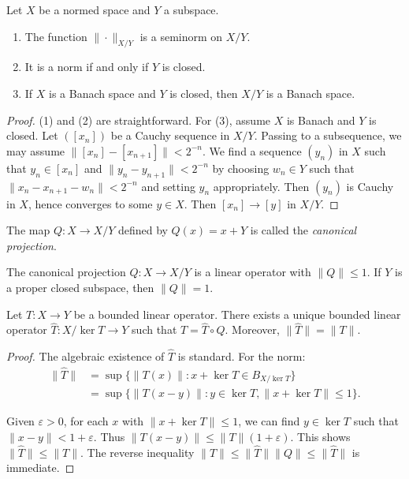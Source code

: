 \begin{proposition}
\label{proposition-quotient-norm-properties}
Let $X$ be a normed space and $Y$ a subspace.
\begin{enumerate}
\item The function $\|\cdot\|_{X/Y}$ is a
seminorm on $X/Y$.
\item It is a norm if and only if $Y$ is
closed.
\item If $X$ is a Banach space and $Y$ is
closed, then $X/Y$ is a Banach space.
\end{enumerate}
\end{proposition}

\begin{proof}
(1) and (2) are straightforward. For (3),
assume $X$ is Banach and $Y$ is closed. Let
$([x_n])$ be a Cauchy sequence in $X/Y$.
Passing to a subsequence, we may assume
$\|[x_n] - [x_{n+1}]\| < 2^{-n}$. We find a
sequence $(y_n)$ in $X$ such that $y_n \in
[x_n]$ and $\|y_n - y_{n+1}\| < 2^{-n}$ by
choosing $w_n \in Y$ such that $\|x_n -
x_{n+1} - w_n\| < 2^{-n}$ and setting $y_n$
appropriately. Then $(y_n)$ is Cauchy in $X$,
hence converges to some $y \in X$. Then
$[x_n] \to [y]$ in $X/Y$.
\end{proof}

\begin{definition}
\label{definition-canonical-projection}
The map $Q : X \to X/Y$ defined by $Q(x) =
x+Y$ is called the {\it canonical
projection}.
\end{definition}

\begin{proposition}
\label{proposition-canonical-projection-norm}
The canonical projection $Q : X \to X/Y$ is a
linear operator with $\|Q\| \leq 1$. If $Y$
is a proper closed subspace, then $\|Q\| =
1$.
\end{proposition}

\begin{theorem}
\label{theorem-isomorphism-theorem-operators}
Let $T : X \to Y$ be a bounded linear
operator. There exists a unique bounded
linear operator $\widehat{T} : X/\ker T \to
Y$ such that $T = \widehat{T} \circ Q$.
Moreover, $\|\widehat{T}\| = \|T\|$.
\end{theorem}

\begin{proof}
The algebraic existence of $\widehat{T}$ is
standard. For the norm:
$$
\begin{aligned}
\|\widehat{T}\| &= \sup \{ \|T(x)\| : x+\ker
T \in B_{X/\ker T} \} \\ &= \sup \{
\|T(x-y)\| : y \in \ker T, \|x+\ker T\| \leq
1 \}.
\end{aligned}
$$

\noindent
Given $\varepsilon > 0$, for each $x$ with
$\|x+\ker T\| \leq 1$, we can find $y \in
\ker T$ such that $\|x-y\| < 1+\varepsilon$.
Thus $\|T(x-y)\| \leq \|T\|(1+\varepsilon)$.
This shows $\|\widehat{T}\| \leq \|T\|$. The
reverse inequality $\|T\| \leq
\|\widehat{T}\|\|Q\| \leq \|\widehat{T}\|$ is
immediate.
\end{proof}

